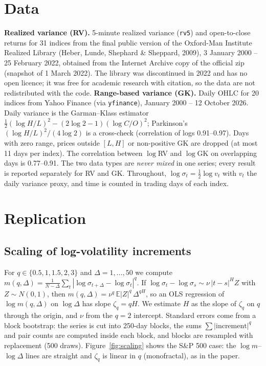 \documentclass[11pt,a4paper]{article}
\begin{document}
\section{Data}
\textbf{Realized variance (RV).} 5-minute realized variance (\texttt{rv5}) and open-to-close returns
for 31 indices from the final public version of the Oxford-Man Institute Realized Library
(Heber, Lunde, Shephard \& Sheppard, 2009), 3 January 2000 -- 25 February 2022, obtained from the
Internet Archive copy of the official zip (snapshot of 1 March 2022). The library was discontinued in
2022 and has no open licence; it was free for academic research with citation, so the data are not
redistributed with the code.
\textbf{Range-based variance (GK).} Daily OHLC for 20 indices from Yahoo Finance (via \texttt{yfinance}),
January 2000 -- 12 October 2026. Daily variance is the Garman--Klass estimator
$\tfrac12(\log H/L)^2-(2\log2-1)(\log C/O)^2$; Parkinson's $(\log H/L)^2/(4\log2)$ is a cross-check
(correlation of logs 0.91--0.97). Days with zero range, prices outside $[L,H]$ or non-positive GK are
dropped (at most 11 days per index). The correlation between $\log$RV and $\log$GK on overlapping days is
0.77--0.91.
The two data types are \emph{never mixed} in one series; every result is reported separately for RV and GK.
Throughout, $\log\sigma_t=\tfrac12\log v_t$ with $v_t$ the daily variance proxy, and time is counted in
trading days of each index.

\section{Replication}
\subsection{Scaling of log-volatility increments}
For $q\in\{0.5,1,1.5,2,3\}$ and $\Delta=1,\dots,50$ we compute
$m(q,\Delta)=\frac{1}{N-\Delta}\sum_t|\log\sigma_{t+\Delta}-\log\sigma_t|^q$.
If $\log\sigma_t-\log\sigma_s\sim\nu\,|t-s|^H Z$ with $Z\sim N(0,1)$, then
$m(q,\Delta)=\nu^q\,\mathbb E|Z|^q\,\Delta^{qH}$, so an OLS regression of $\log m(q,\Delta)$ on $\log\Delta$
has slope $\zeta_q=qH$. We estimate $H$ as the slope of $\zeta_q$ on $q$ through the origin, and $\nu$ from
the $q=2$ intercept. Standard errors come from a block bootstrap: the series is cut into 250-day
blocks, the sums $\sum|\text{increment}|^q$ and pair counts are computed inside each block, and blocks are
resampled with replacement (500 draws). Figure~\ref{fig:scaling} shows the S\&P 500 case: the
$\log m$--$\log\Delta$ lines are straight and $\zeta_q$ is linear in $q$ (monofractal), as in the paper.
\end{document}
